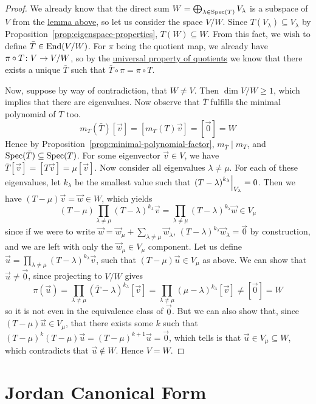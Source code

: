 \begin{proof}
    We already know that the direct sum \(W = \bigoplus_{\lambda\in\operatorname{Spec}(T)} V_{\lambda}\)
    is a subspace of \(V\) from the \hyperref[lem:eigenspace-direct-sum]{lemma above},
    so let us consider the space \(V/W\).
    Since \(T(V_\lambda) \subseteq V_\lambda\) by Proposition~\ref{prop:eigenspace-properties},
    \(T(W) \subseteq W\).
    From this fact, we wish to define \(\bar{T} \in \operatorname{End}(V/W)\).
    For \(\pi\) being the quotient map,
    we already have \(\pi \circ T\colon V\to V/W\),
    so by the \hyperref[prop:univ-prop-quotient-vsp]{universal property of quotients}
    we know that there exists a unique \(\bar{T}\) such that \(\bar{T}\circ\pi = \pi \circ T\).

    Now, suppose by way of contradiction, that \(W \neq V\).
    Then \(\dim V/W \geq 1\), which implies that there are eigenvalues.
    Now observe that \(\bar{T}\) fulfills the minimal polynomial of \(T\) too.
    \begin{equation*}
        m_T(\bar{T})[\vec{v}] = [m_T(T)\vec{v}] = [\vec{0}] = W
    \end{equation*}
    Hence by Proposition~\ref{prop:minimal-polynomial-factor},
    \(m_{\bar{T}} \mid m_T\), and \(\operatorname{Spec}(\bar{T}) \subseteq \operatorname{Spec}(T)\).
    For some eigenvector \(\vec{v} \in V\),
    we have \(\bar{T}[\vec{v}] = [T\vec{v}] = \mu[\vec{v}]\).
    Now consider all eigenvalues \(\lambda \neq \mu\).
    For each of these eigenvalues, let \(k_\lambda\) be the smallest value
    such that \(\eval{{(T-\lambda)}^{k_\lambda}}_{V_\lambda} = 0\).
    Then we have \((T-\mu)\vec{v} = \vec{w} \in W\), which yields
    \begin{equation*}
        (T-\mu) \prod_{\lambda\neq\mu} {(T-\lambda)}^{k_\lambda} \vec{v}
        = \prod_{\lambda\neq\mu} {(T-\lambda)}^{k_\lambda} \vec{w} \in V_\mu
    \end{equation*}
    since if we were to write \(\vec{w} = \vec{w}_\mu + \sum_{\lambda\neq\mu} \vec{w}_\lambda\),
    \({(T-\lambda)}^{k_\lambda} \vec{w}_\lambda = \vec{0}\) by construction,
    and we are left with only the \(\vec{w}_\mu \in V_\mu\) component.
    Let us define \(\vec{u} = \prod_{\lambda\neq\mu} {(T-\lambda)}^{k_\lambda} \vec{v}\),
    such that \((T-\mu)\vec{u} \in V_\mu\) as above.
    We can show that \(\vec{u} \neq \vec{0}\), since projecting to \(V/W\) gives
    \begin{equation*}
        \pi(\vec{u}) = \prod_{\lambda\neq\mu} {(\bar{T}-\lambda)}^{k_\lambda} [\vec{v}]
        = \prod_{\lambda\neq\mu} {(\mu-\lambda)}^{k_\lambda} [\vec{v}]
        \neq [\vec{0}] = W
    \end{equation*}
    so it is not even in the equivalence class of \(\vec{0}\).
    But we can also show that, since \((T-\mu)\vec{u} \in V_\mu\),
    that there exists some \(k\) such that
    \({(T-\mu)}^k(T-\mu)\vec{u} = {(T-\mu)}^{k+1}\vec{u} = \vec{0}\),
    which tells is that \(\vec{u} \in V_\mu \subseteq W\),
    which contradicts that \(\vec{u} \notin W\).
    Hence \(V = W\).
\end{proof}


\section{Jordan Canonical Form}
